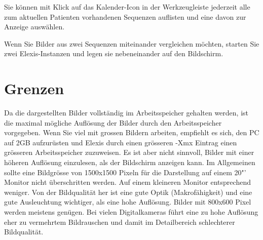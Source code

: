 \documentclass[a4paper]{scrartcl}
\begin{document}
Sie können mit Klick auf das Kalender-Icon in der Werkzeugleiste jederzeit alle zum aktuellen Patienten vorhandenen Sequenzen auflisten und eine davon zur Anzeige auswählen.

Wenn Sie Bilder aus zwei Sequenzen miteinander vergleichen möchten, starten Sie zwei Elexis-Instanzen und legen sie nebeneinander auf den Bildschirm.

\section{Grenzen}
Da die dargestellten Bilder vollständig im Arbeitsspeicher gehalten werden, ist die maximal mögliche Auflösung der Bilder durch den Arbeitsspeicher vorgegeben. Wenn Sie viel mit grossen Bildern arbeiten, empfiehlt es sich, den PC auf 2GB aufzurüsten und Elexis durch einen grösseren -Xmx Eintrag einen grösseren Arbeitsspeicher zuzuweisen. Es ist aber nicht sinnvoll, Bilder mit einer höheren Auflösung einzulesen, als der Bildschirm anzeigen kann. Im Allgemeinen sollte eine Bildgrösse von 1500x1500 Pixeln für die Darstellung auf einem 20"' Monitor nicht überschritten werden. Auf einem kleineren Monitor entsprechend weniger. Von der Bildqualität her ist eine gute Optik (Makrofähigkeit) und eine gute Ausleuchtung wichtiger, als eine hohe Auflösung. Bilder mit 800x600 Pixel werden meistens genügen. Bei vielen Digitalkameras führt eine zu hohe Auflösung eher zu vermehrtem Bildrauschen und damit im Detailbereich schlechterer Bildqualität.
\end{document}
